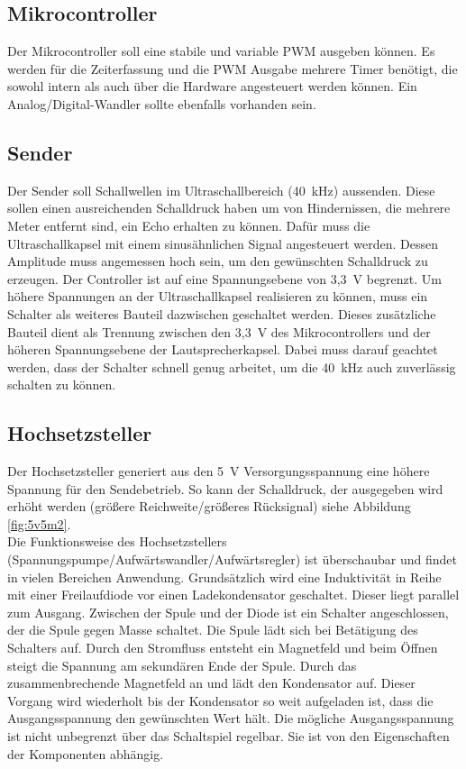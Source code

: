 \subsection{Mikrocontroller}
Der Mikrocontroller soll eine stabile und variable PWM ausgeben können. Es werden für die Zeiterfassung und die PWM Ausgabe mehrere Timer benötigt, die sowohl intern als auch über die Hardware angesteuert werden können. Ein Analog/Digital-Wandler sollte ebenfalls vorhanden sein.

\subsection{Sender}
Der Sender soll Schallwellen im Ultraschallbereich (40~kHz) aussenden. Diese sollen einen ausreichenden Schalldruck haben um von Hindernissen, die mehrere Meter entfernt sind, ein Echo erhalten zu können. Dafür muss die Ultraschallkapsel mit einem sinusähnlichen Signal angesteuert werden. Dessen Amplitude muss angemessen hoch sein, um den gewünschten Schalldruck zu erzeugen. Der Controller ist auf eine Spannungsebene von 3,3~V begrenzt. Um höhere Spannungen an der Ultraschallkapsel realisieren zu können, muss ein Schalter als weiteres Bauteil dazwischen geschaltet werden. Dieses zusätzliche Bauteil dient als Trennung zwischen den 3,3~V des Mikrocontrollers und der höheren Spannungsebene der Lautsprecherkapsel. Dabei muss darauf geachtet werden, dass der Schalter schnell genug arbeitet, um die 40~kHz auch zuverlässig schalten zu können.

\subsection{Hochsetzsteller}
Der Hochsetzsteller generiert aus den 5~V Versorgungsspannung eine höhere Spannung für den Sendebetrieb. So kann der Schalldruck, der ausgegeben wird erhöht werden (größere Reichweite/größeres Rücksignal) siehe Abbildung \ref{fig:5v5m2}.\\
Die Funktionsweise des Hochsetzstellers (Spannungspumpe/Aufwärtswandler/Aufwärtsregler) ist überschaubar und findet in vielen Bereichen Anwendung. Grundsätzlich wird eine Induktivität in Reihe mit einer Freilaufdiode vor einen Ladekondensator geschaltet. Dieser liegt parallel zum Ausgang. Zwischen der Spule und der Diode ist ein Schalter angeschlossen, der die Spule gegen Masse schaltet. Die Spule lädt sich bei Betätigung des Schalters auf. Durch den Stromfluss entsteht ein Magnetfeld und beim Öffnen steigt die Spannung am sekundären Ende der Spule. Durch das zusammenbrechende Magnetfeld an und lädt den Kondensator auf. Dieser Vorgang wird wiederholt bis der Kondensator so weit aufgeladen ist, dass die Ausgangsspannung den gewünschten Wert hält. Die mögliche Ausgangsspannung ist nicht unbegrenzt über das Schaltspiel regelbar. Sie ist von den Eigenschaften der Komponenten abhängig. 

